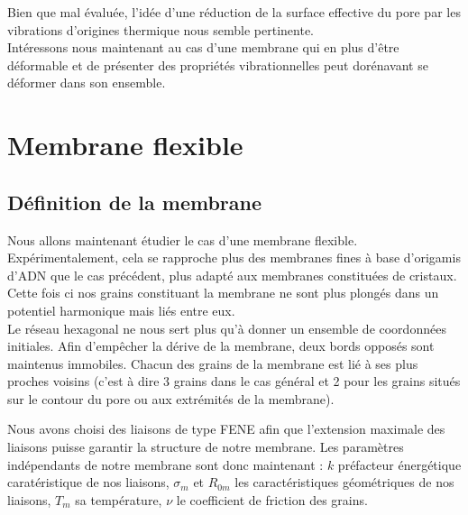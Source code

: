 Bien que mal évaluée, l'idée d'une réduction de la surface effective du pore par les vibrations d'origines thermique nous semble pertinente.\\

Intéressons nous maintenant au cas d'une membrane qui en plus d'être déformable et de présenter des propriétés vibrationnelles peut dorénavant se déformer dans son ensemble.





\newpage




\section{Membrane flexible}
\subsection{Définition de la membrane}
\label{chapitrememflex}

Nous allons maintenant étudier le cas d'une membrane flexible. Expérimentalement, cela se rapproche plus des membranes fines à base d'origamis d'ADN \cite{2Bell2012,HernndezAinsa2013} que le cas précédent, plus adapté aux membranes constituées de cristaux. Cette fois ci nos grains constituant la membrane ne sont plus plongés dans un potentiel harmonique mais liés entre eux.\\

Le réseau hexagonal ne nous sert plus qu'à donner un ensemble de coordonnées initiales. Afin d'empêcher la dérive de la membrane, deux bords opposés sont maintenus immobiles. Chacun des grains de la membrane est lié à ses plus proches voisins (c'est à dire 3 grains dans le cas général et 2 pour les grains situés sur le contour du pore ou aux extrémités de la membrane).

Nous avons choisi des liaisons de type FENE afin que l'extension maximale des liaisons puisse garantir la structure de notre membrane. Les paramètres indépendants de notre membrane sont donc maintenant : $k$ préfacteur énergétique caratéristique de nos liaisons, $\sigma_m$ et $R_{0m}$ les caractéristiques géométriques de nos liaisons, $T_m$ sa température, $\nu$ le coefficient de friction des grains. 

